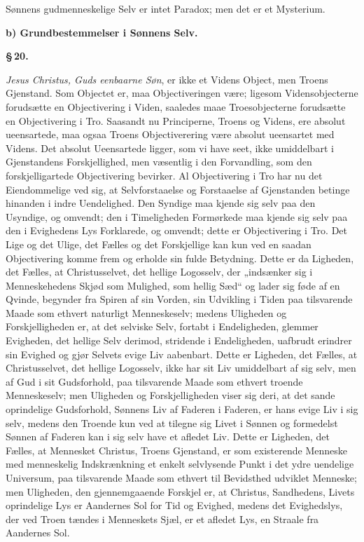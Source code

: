 \documentclass[12pt]{book}
\newcommand{\parmark}[1]{\begin{center}{\bfseries \S\,#1.}\end{center}}
\newcommand{\runhead}[1]{%
  \medskip\begin{center}{\bfseries #1}\end{center}\medskip}
\begin{document}
Sønnens gudmenneskelige Selv er intet Paradox; men det er et
Mysterium.

\runhead{b) Grundbestemmelser i Sønnens Selv.}
\parmark{20}

\emph{Jesus Christus, Guds eenbaarne Søn}, er ikke et Videns Object,
men Troens Gjenstand. Som Objectet er, maa Objectiveringen være;
ligesom Vidensobjecterne forudsætte en Objectivering i Viden,
saaledes maae Troesobjecterne forudsætte en Objectivering i Tro.
Saasandt nu Principerne, Troens og Videns, ere absolut ueensartede,
maa ogsaa Troens Objectiverering være absolut ueensartet med Videns.
Det absolut Ueensartede ligger, som vi have seet, ikke umiddelbart i
Gjenstandens Forskjellighed, men væsentlig i den Forvandling, som
den forskjelligartede Objectivering bevirker. Al Objectivering i Tro
har nu det Eiendommelige ved sig, at Selvforstaaelse og Forstaaelse
af Gjenstanden betinge hinanden i indre Uendelighed. Den Syndige maa
kjende sig selv paa den Usyndige, og omvendt; den i Timeligheden
Formørkede maa kjende sig selv paa den i Evighedens Lys Forklarede,
og omvendt;
dette er Objectivering i Tro. Det Lige og det Ulige, det Fælles og
det Forskjellige kan kun ved en saadan Objectivering komme frem og
erholde sin fulde Betydning. Dette er da Ligheden, det Fælles, at
Christusselvet, det hellige Logosselv, der „indsænker sig i
Menneskehedens Skjød som Mulighed, som hellig Sæd“ og lader sig føde
af en Qvinde, begynder fra Spiren af sin Vorden, sin Udvikling i
Tiden paa tilsvarende Maade som ethvert naturligt Menneskeselv;
medens Uligheden og Forskjelligheden er, at det selviske Selv,
fortabt i Endeligheden, glemmer Evigheden, det hellige Selv derimod,
stridende i Endeligheden, uafbrudt erindrer sin Evighed og gjør
Selvets evige Liv aabenbart. Dette er Ligheden, det Fælles, at
Christusselvet, det hellige Logosselv, ikke har sit Liv umiddelbart
af sig selv, men af Gud i sit Gudsforhold, paa tilsvarende Maade som
ethvert troende Menneskeselv; men Uligheden og Forskjelligheden
viser sig deri, at det sande oprindelige Gudsforhold, Sønnens Liv af
Faderen i Faderen, er hans evige Liv i sig selv, medens den Troende
kun ved at tilegne sig Livet i Sønnen og formedelst Sønnen af
Faderen kan i sig selv have et afledet Liv. Dette er Ligheden, det
Fælles, at Mennesket Christus, Troens Gjenstand, er som existerende
Menneske med menneskelig Indskrænkning et enkelt selvlysende Punkt i
det ydre uendelige Universum, paa tilsvarende Maade som ethvert til
Bevidsthed udviklet Menneske; men Uligheden, den gjennemgaaende
Forskjel er, at Christus, Sandhedens, Livets oprindelige Lys er
Aandernes Sol for Tid og Evighed, medens det Evighedslys, der ved
Troen tændes i Menneskets Sjæl, er et afledet Lys, en Straale fra
Aandernes Sol.
\end{document}

